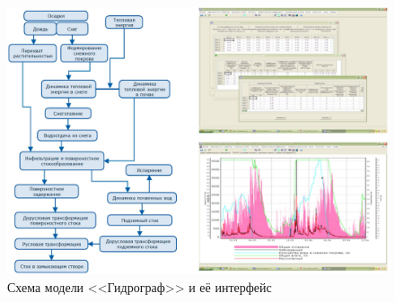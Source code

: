 \begin{figure}[h!]
\begin{changemargin}{-1.25cm}{0cm}
  \begin{center}
    \includegraphics[width=1.2\textwidth]{authors/nesterova-1-fig-1.jpg}
  \end{center}
\end{changemargin}
  \caption{Схема модели <<Гидрограф>> и её интерфейс}
  \label{fig:nesterova-1-fig-1}
\end{figure}
